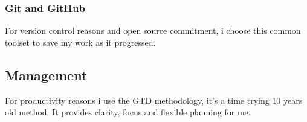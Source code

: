 			\subsubsection{Git and GitHub}
For version control reasons and open source commitment, i choose this common toolset to save my work as it progressed.
		\subsection{Management}
For productivity reasons i use the GTD methodology, it's a time trying 10 years old method. It provides clarity, focus and flexible planning for me. 

